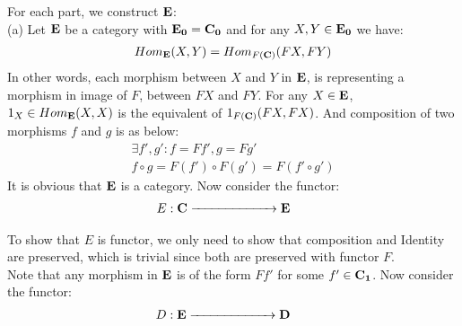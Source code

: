For each part, we construct $\bf E$: \vspace{0.7cm} \\
\phantom{llll}(a)
Let $\bf E$ be a category with $\bf E_0 = C_0$ and for any $X, Y \in \bf E_0$ we have: 
\begin{gather*}
    Hom_{\bf E}(X, Y) = Hom_{F(\bf{C})}(FX, FY)
\end{gather*}
In other words, each morphism between $X$ and $Y$ in $\bf E$, is representing a morphism in image of $F$, between $FX$ and $FY$. For any $X \in \bf E$, $1_X \in Hom_{\bf E}(X, X)$ is the equivalent of $1_{F(\bf C)}(FX, FX)$. And composition of two morphisms $f$ and $g$ is as below:
\begin{gather*}
    \exists f', g': f = Ff', g = Fg' \\
    f \circ g = F(f') \circ F(g') = F(f' \circ g')
\end{gather*}
It is obvious that $\bf E$ is a category.
Now consider the functor:
\begin{gather*}
    E: \bf C \xrightarrow{\hspace*{2.2cm}} E \phantom{lllll}
\end{gather*}
\begin{center}
\end{center}
To show that $E$ is functor, we only need to show that composition and Identity are preserved, which is trivial since both are preserved with functor $F$.\\
Note that any morphism in $\bf E$ is of the form $Ff'$ for some $f' \in \bf C_1$.
Now consider the functor:
\newpage
\begin{gather*}
    D: \bf E \xrightarrow{\hspace*{2.2cm}} D \phantom{lllll}
\end{gather*}
\begin{center}
\end{center}
